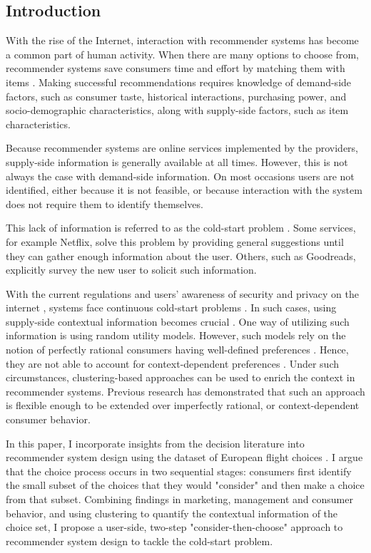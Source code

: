 \documentclass[a4paper,12pt]{article}
\begin{document}
\subsection{Introduction}

With the rise of the Internet, interaction with recommender systems has become a common part of human activity. When there are many options to choose from, recommender systems save consumers time and effort by matching them with items \citep{bobadilla2013recommender}. Making successful recommendations requires knowledge of demand-side factors, such as consumer taste, historical interactions, purchasing power, and socio-demographic characteristics, along with supply-side factors, such as item characteristics.

Because recommender systems are online services implemented by the providers, supply-side information is generally available at all times. However, this is not always the case with demand-side information. On most occasions users are not identified, either because it is not feasible, or because interaction with the system does not require them to identify themselves.

This lack of information is referred to as the cold-start problem \citep{adomavicius2005toward}. Some services, for example Netflix, solve this problem by providing general suggestions until they can gather enough information about the user. Others, such as Goodreads, explicitly survey the new user to solicit such information.

With the current regulations and users' awareness of security and privacy on the internet \citep{anton2010internet}, systems face continuous cold-start problems \citep{wong2014online}. In such cases, using supply-side contextual information becomes crucial \citep{adomavicius2005toward}. One way of utilizing such information is using random utility models. However, such models rely on the notion of perfectly rational consumers having well-defined preferences \citep{babutsidze2019asymmetric}. Hence, they are not able to account for context-dependent preferences \citep{tversky1979preference}. Under such circumstances, clustering-based approaches can be used to enrich the context in recommender systems. Previous research \citep{babutsidze2019asymmetric} has demonstrated that such an approach is flexible enough to be extended over imperfectly rational, or context-dependent consumer behavior.

In this paper, I incorporate insights from the decision literature into recommender system design using the dataset of European flight choices \citep{lheritier2019airline}. I argue that the choice process occurs in two sequential stages: consumers first identify the small subset of the choices that they would "consider" and then make a choice from that subset. Combining findings in marketing, management and consumer behavior, and using clustering to quantify the contextual information of the choice set,  I propose a user-side, two-step  "consider-then-choose" \citep{liu2011efficient, gilbride2004choice} approach to recommender system design to tackle the cold-start problem. 
\end{document}
